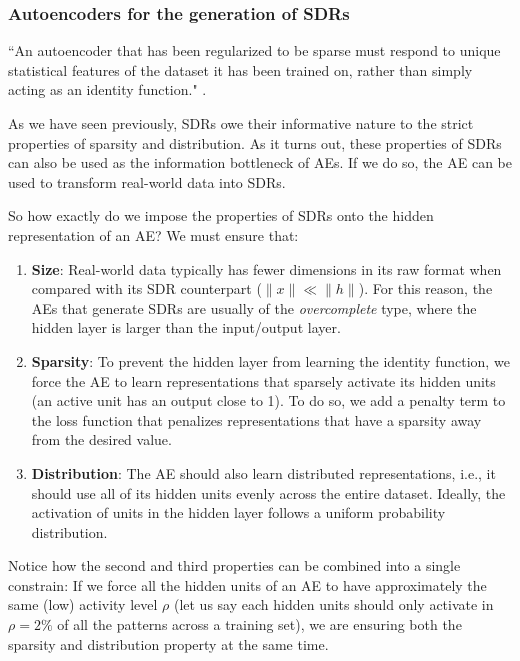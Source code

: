 \documentclass[runningheads]{llncs}
\begin{document}
\subsubsection{Autoencoders for the generation of SDRs}
\label{sec:prescriptions_AEs_sparse}

``An autoencoder that has been regularized to be sparse must
respond to unique statistical features of the dataset it has been trained on, rather than simply acting as an identity function." \cite{bengio2017deep}.

As we have seen previously, SDRs owe their informative nature to the strict properties of sparsity and distribution. As it turns out, these properties of SDRs can also be used as the information bottleneck of AEs. If we do so, the AE can be used to transform real-world data into SDRs.

So how exactly do we impose the properties of SDRs onto the hidden representation of an AE? We must ensure that:
\begin{enumerate}
    \item \textbf{Size}: Real-world data typically has fewer dimensions in its raw format when compared with its SDR counterpart ($\|x\| \ll \|h\|$). For this reason, the AEs that generate SDRs are usually of the \textit{overcomplete} type, where the hidden layer is larger than the input/output layer.
    
    \item \textbf{Sparsity}: To prevent the hidden layer from learning the identity function, we force the AE to learn representations that sparsely activate its hidden units (an active unit has an output close to 1). To do so, we add a penalty term to the loss function that penalizes representations that have a sparsity away from the desired value.
    
    \item \textbf{Distribution}: The AE should also learn distributed representations, i.e., it should use all of its hidden units evenly across the entire dataset. Ideally, the activation of units in the hidden layer follows a uniform probability distribution.
\end{enumerate}

Notice how the second and third properties can be combined into a single constrain: If we force all the hidden units of an AE to have approximately the same (low) activity level $\rho$ (let us say each hidden units should only activate in $\rho=2\%$ of all the patterns across a training set), we are ensuring both the sparsity and distribution property at the same time.
\end{document}
